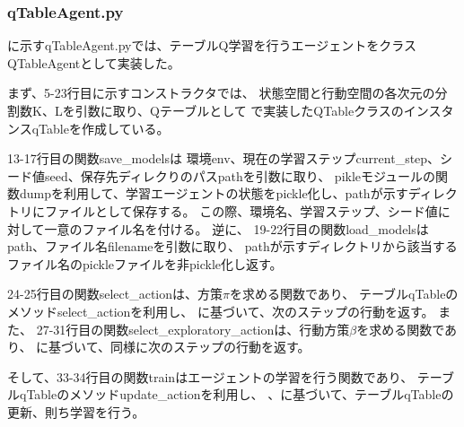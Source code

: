 \documentclass[a4paper,11pt]{jsarticle}
\begin{document}
\subsubsection{qTableAgent.py} \label{seq:qTableAgent}
に示すqTableAgent.pyでは、テーブルQ学習を行うエージェントをクラスQTableAgentとして実装した。
\par
まず、5-23行目に示すコンストラクタでは、
状態空間と行動空間の各次元の分割数K、Lを引数に取り、Qテーブルとして
で実装したQTableクラスのインスタンスqTableを作成している。
\par
13-17行目の関数save\_modelsは
環境env、現在の学習ステップcurrent\_step、シード値seed、保存先ディレクりのパスpathを引数に取り、
pikleモジュールの関数dumpを利用して、学習エージェントの状態をpickle化し、pathが示すディレクトリにファイルとして保存する。
この際、環境名、学習ステップ、シード値に対して一意のファイル名を付ける。
逆に、
19-22行目の関数load\_modelsはpath、ファイル名filenameを引数に取り、
pathが示すディレクトリから該当するファイル名のpickleファイルを非pickle化し返す。
\par
24-25行目の関数select\_actionは、方策$\pi$を求める関数であり、
テーブルqTableのメソッドselect\_actionを利用し、
に基づいて、次のステップの行動を返す。
また、
27-31行目の関数select\_exploratory\_actionは、行動方策$\beta$を求める関数であり、
に基づいて、同様に次のステップの行動を返す。
\par
そして、33-34行目の関数trainはエージェントの学習を行う関数であり、
テーブルqTableのメソッドupdate\_actionを利用し、
、に基づいて、テーブルqTableの更新、則ち学習を行う。


\end{document}
